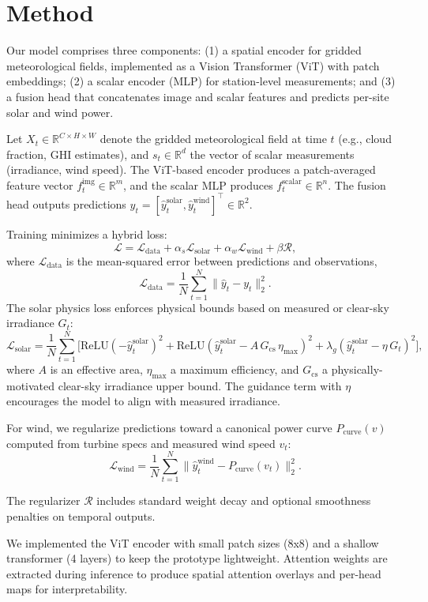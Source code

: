 \section*{Method}

Our model comprises three components: (1) a spatial encoder for gridded meteorological fields, implemented as a Vision Transformer (ViT) with patch embeddings; (2) a scalar encoder (MLP) for station-level measurements; and (3) a fusion head that concatenates image and scalar features and predicts per-site solar and wind power.

Let $X_t \in \mathbb{R}^{C\times H \times W}$ denote the gridded meteorological field at time $t$ (e.g., cloud fraction, GHI estimates), and $s_t \in \mathbb{R}^d$ the vector of scalar measurements (irradiance, wind speed). The ViT-based encoder produces a patch-averaged feature vector $f^{\text{img}}_t \in \mathbb{R}^m$, and the scalar MLP produces $f^{\text{scalar}}_t \in \mathbb{R}^n$. The fusion head outputs predictions $\hat{y}_t = [\hat{y}^{\text{solar}}_t, \hat{y}^{\text{wind}}_t]^\top \in \mathbb{R}^2$.

Training minimizes a hybrid loss:
$$
\mathcal{L} = \mathcal{L}_{\text{data}} + \alpha_{s}\mathcal{L}_{\text{solar}} + \alpha_{w}\mathcal{L}_{\text{wind}} + \beta \mathcal{R},
$$
where $\mathcal{L}_{\text{data}}$ is the mean-squared error between predictions and observations,
$$
\mathcal{L}_{\text{data}} = \frac{1}{N}\sum_{t=1}^N \|\hat{y}_t - y_t\|_2^2.
$$
The solar physics loss enforces physical bounds based on measured or clear-sky irradiance $G_t$:
$$
\mathcal{L}_{\text{solar}} = \frac{1}{N}\sum_{t=1}^N \Big[\text{ReLU}(-\hat{y}^{\text{solar}}_t)^2 + \text{ReLU}(\hat{y}^{\text{solar}}_t - A\,G_{\text{cs}}\,\eta_{\max})^2 + \lambda_g(\hat{y}^{\text{solar}}_t - \eta\,G_t)^2\Big],
$$
where $A$ is an effective area, $\eta_{\max}$ a maximum efficiency, and $G_{\text{cs}}$ a physically-motivated clear-sky irradiance upper bound. The guidance term with $\eta$ encourages the model to align with measured irradiance.

For wind, we regularize predictions toward a canonical power curve $P_{\text{curve}}(v)$ computed from turbine specs and measured wind speed $v_t$:
$$
\mathcal{L}_{\text{wind}} = \frac{1}{N}\sum_{t=1}^N \|\hat{y}^{\text{wind}}_t - P_{\text{curve}}(v_t)\|_2^2.
$$

The regularizer $\mathcal{R}$ includes standard weight decay and optional smoothness penalties on temporal outputs.

We implemented the ViT encoder with small patch sizes (8x8) and a shallow transformer (4 layers) to keep the prototype lightweight. Attention weights are extracted during inference to produce spatial attention overlays and per-head maps for interpretability.
